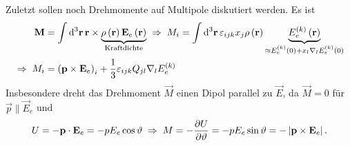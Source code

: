 Zuletzt sollen noch Drehmomente auf Multipole diskutiert werden. Es ist
\begin{align*}
	\vec {M}           & =\int \diffa[3]{\vec{r}}\vec {r}\times \underset{\text{Kraftdichte}}{\underbrace{\rho \left(\vec {r}\right)\vec {E}_{e}\left(\vec {r}\right)}}\implication M_{i}=\int \diffa[3]{\vec{r}}\varepsilon _{ijk}x_{j}\rho \left(\vec {r}\right)\underset{\approx E_{e}^{\left(k\right)}\left(0\right)+x_{l}\nabla _{l}E_{e}^{\left(k\right)}\left(0\right)}{\underbrace{E_{e}^{\left(k\right)}\left(\vec {r}\right)}} \\
	\implication M_{i} & =\left(\vec {p}\times \vec {E}_{e}\right)_{i}+\frac{1}{3}\varepsilon _{ijk}Q_{jl}\nabla _{l}E_{e}^{\left(k\right)}
\end{align*}
Insbesondere dreht das Drehmoment $\vec {M}$ einen Dipol parallel zu $\vec {E}$, da $\vec {M}=0$ für $\vec {p}\parallel \vec {E}_{e}$ und
\begin{equation*}
	U=-\vec {p}\cdot \vec {E}_{e}=-pE_{e}\cos \vartheta \implication M=-\frac{\partial U}{\partial \vartheta }=-pE_{e}\sin \vartheta =-\left| \vec {p}\times \vec {E}_{e}\right| .
\end{equation*}